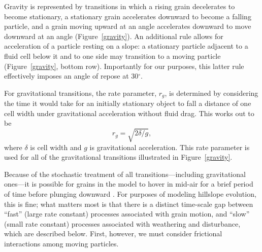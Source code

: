 \documentclass[esurf, manuscript]{copernicus}
\begin{document}
Gravity is represented by transitions in which a rising grain decelerates to become stationary, a stationary grain accelerates downward to become a falling particle, and a grain moving upward at an angle accelerates downward to move downward at an angle (Figure~\ref{gravity}). An additional rule allows for acceleration of a particle resting on a slope: a stationary particle adjacent to a fluid cell below it and to one side may transition to a moving particle %
(Figure~\ref{gravity}, bottom row). Importantly for our purposes, this latter rule effectively imposes an angle of repose at 30$^\circ$.

For gravitational transitions, the rate parameter, $r_g$, is determined by considering the time it would take for an initially stationary object to fall a distance of one cell width under gravitational acceleration without fluid drag. This works out to be
\begin{equation}
r_g = \sqrt{2\delta / g},
\end{equation}
where $\delta$ is cell width and $g$ is gravitational acceleration. This rate parameter is used for all of the gravitational transitions illustrated in Figure~\ref{gravity}. 

Because of the stochastic treatment of all transitions---including gravitational ones---it is possible for grains in the model to hover in mid-air for a brief period of time before plunging downward \citep[e.g.,][]{coyote1949fast}. For purposes of modeling hillslope evolution, this is fine; what matters most is that there is a distinct time-scale gap between ``fast'' (large rate constant) processes associated with grain motion, and ``slow'' (small rate constant) processes associated with weathering and disturbance, which are described below. First, however, we must consider frictional interactions among moving particles.
\end{document}
